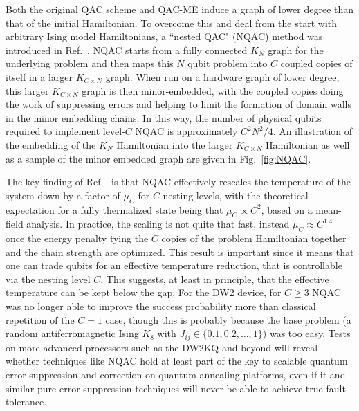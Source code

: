 Both the original QAC scheme and QAC-ME induce a graph of lower degree than that of the initial Hamiltonian. To overcome this and deal from the start with arbitrary Ising model Hamiltonians, a ``nested QAC" (NQAC) method was introduced in Ref.~\cite{vinci2015nested}. NQAC starts from a fully connected $K_N$ graph for the underlying problem and then maps this $N$ qubit problem into $C$ coupled copies of itself in a larger $K_{C\times N}$ graph. When run on a hardware graph of lower degree, this larger $K_{C\times N}$ graph is then minor-embedded, with the coupled copies doing the work of suppressing errors and helping to limit the formation of domain walls in the minor embedding chains. In this way, the number of physical qubits required to implement level-$C$ NQAC is approximately $C^2 N^2/4$. An illustration of the embedding of the $K_N$ Hamiltonian into the larger $K_{C\times N}$ Hamiltonian as well as a sample of the minor embedded graph are given in Fig.~\ref{fig:NQAC}.

The key finding of Ref.~\cite{vinci2015nested} is that NQAC effectively rescales the temperature of the system down by a factor of $\mu_C$ for $C$ nesting levels, with the theoretical expectation for a fully thermalized state being that $\mu_C\propto C^2$, based on a mean-field analysis. In practice, the scaling is not quite that fast, instead $\mu_C\approx C^{1.4}$ once the energy penalty tying the $C$ copies of the problem Hamiltonian together and the chain strength are optimized. This result is important since it means that one can trade qubits for an effective temperature reduction, that is controllable via the nesting level $C$. This suggests, at least in principle, that the effective temperature can be kept below the gap. For the DW2 device, for $C\geq 3$ NQAC was no longer able to improve the success probability more than classical repetition of the $C=1$ case, though this is probably because the base problem (a random antiferromagnetic Ising $K_8$ with $J_{ij}\in\{0.1,0.2,\dots,1\}$) was too easy. Tests on more advanced processors such as the DW2KQ and beyond will reveal whether techniques like NQAC hold at least part of the key to scalable quantum error suppression and correction on quantum annealing platforms, even if it and similar pure error suppression techniques will never be able to achieve true fault tolerance.

